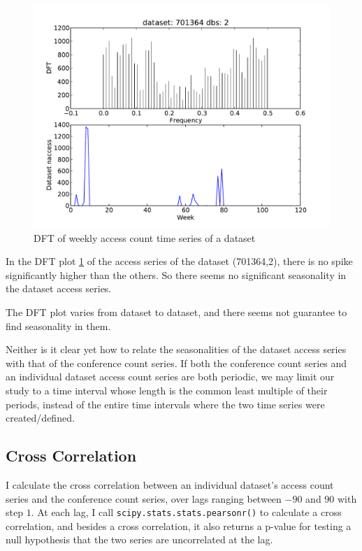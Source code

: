 \documentclass[preprint, 12pt]{elsarticle}
\begin{document}
\begin{figure}
\begin{center}
\includegraphics[scale=0.5]{../data/timeseries/datasets/701364_2_116_fft.pdf}
\end{center}
\caption{DFT of weekly access count time series of a dataset}
\label{dsfft2}
\end{figure}


In the DFT plot \ref{dsfft2} of the access series of the dataset (701364,2), there is no spike significantly higher than the others. So there seems no significant seasonality in the dataset access series.

The DFT plot varies from dataset to dataset, and there seems not guarantee to find seasonality in them.

Neither is it clear yet how to relate the seasonalities of the dataset access series with that of the conference count series.
If both the conference count series and an individual dataset access count series are both periodic,
we may limit our study to a time interval whose length is the common least multiple of their periods, instead of the entire time intervals where the two time series were created/defined.


\subsection{Cross Correlation}

I calculate the cross correlation between  an individual dataset's access count series and the conference count series, over lags ranging between $-90$ and $90$ with step $1$. At each lag, I call \verb|scipy.stats.stats.pearsonr()| to calculate a cross correlation, and besides a cross correlation, it also returns a p-value for testing a null hypothesis that the two series are uncorrelated at the lag.
\end{document}
